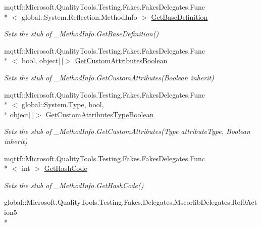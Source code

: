 \begin{DoxyCompactItemize}
mqttf\-::\-Microsoft.\-Quality\-Tools.\-Testing.\-Fakes.\-Fakes\-Delegates.\-Func\\*
$<$ global\-::\-System.\-Reflection.\-Method\-Info $>$ \hyperlink{class_system_1_1_runtime_1_1_interop_services_1_1_fakes_1_1_stub___method_info_a04bdc77ba62bec862aa63f5291bf3704}{Get\-Base\-Definition}
\begin{DoxyCompactList}\small\item\em Sets the stub of \-\_\-\-Method\-Info.\-Get\-Base\-Definition()\end{DoxyCompactList}\item 
mqttf\-::\-Microsoft.\-Quality\-Tools.\-Testing.\-Fakes.\-Fakes\-Delegates.\-Func\\*
$<$ bool, object\mbox{[}$\,$\mbox{]}$>$ \hyperlink{class_system_1_1_runtime_1_1_interop_services_1_1_fakes_1_1_stub___method_info_aceb185c0cd7a14a15ccff6456fd6917b}{Get\-Custom\-Attributes\-Boolean}
\begin{DoxyCompactList}\small\item\em Sets the stub of \-\_\-\-Method\-Info.\-Get\-Custom\-Attributes(\-Boolean inherit)\end{DoxyCompactList}\item 
mqttf\-::\-Microsoft.\-Quality\-Tools.\-Testing.\-Fakes.\-Fakes\-Delegates.\-Func\\*
$<$ global\-::\-System.\-Type, bool, \\*
object\mbox{[}$\,$\mbox{]}$>$ \hyperlink{class_system_1_1_runtime_1_1_interop_services_1_1_fakes_1_1_stub___method_info_a5e86ee1c1004e2d7042084cf3dc086cb}{Get\-Custom\-Attributes\-Type\-Boolean}
\begin{DoxyCompactList}\small\item\em Sets the stub of \-\_\-\-Method\-Info.\-Get\-Custom\-Attributes(\-Type attribute\-Type, Boolean inherit)\end{DoxyCompactList}\item 
mqttf\-::\-Microsoft.\-Quality\-Tools.\-Testing.\-Fakes.\-Fakes\-Delegates.\-Func\\*
$<$ int $>$ \hyperlink{class_system_1_1_runtime_1_1_interop_services_1_1_fakes_1_1_stub___method_info_afb85d3b58a5ca343535fefddd504c325}{Get\-Hash\-Code}
\begin{DoxyCompactList}\small\item\em Sets the stub of \-\_\-\-Method\-Info.\-Get\-Hash\-Code()\end{DoxyCompactList}\item 
global\-::\-Microsoft.\-Quality\-Tools.\-Testing.\-Fakes.\-Delegates.\-Mscorlib\-Delegates.\-Ref0\-Action5\\*

\end{DoxyCompactItemize}
